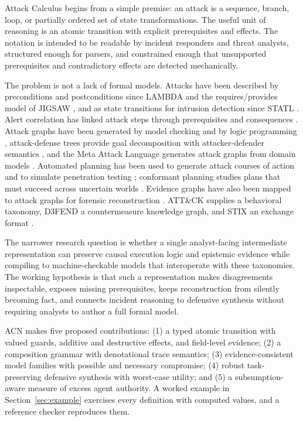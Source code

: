 \documentclass[11pt,letterpaper]{article}
\theoremstyle{definition}
\begin{document}
Attack Calculus begins from a simple premise: an attack is a sequence, branch, loop, or partially ordered set of state transformations. The useful unit of reasoning is an atomic transition with explicit prerequisites and effects. The notation is intended to be readable by incident responders and threat analysts, structured enough for parsers, and constrained enough that unsupported prerequisites and contradictory effects are detected mechanically.

The problem is not a lack of formal models. Attacks have been described by preconditions and postconditions since LAMBDA and the requires/provides model of JIGSAW \cite{cuppens2000,templeton2000}, and as state transitions for intrusion detection since STATL \cite{statl}. Alert correlation has linked attack steps through prerequisites and consequences \cite{ning2002}. Attack graphs have been generated by model checking and by logic programming \cite{sheyner2002,ammann2002,mulval}, attack-defense trees provide goal decomposition with attacker-defender semantics \cite{adtrees}, and the Meta Attack Language generates attack graphs from domain models \cite{mal,konsta2024}. Automated planning has been used to generate attack courses of action and to simulate penetration testing \cite{boddy2005,obes2010,hoffmann2015}; conformant planning studies plans that must succeed across uncertain worlds \cite{cimatti2004}. Evidence graphs have also been mapped to attack graphs for forensic reconstruction \cite{liu2012evidence}. ATT\&CK supplies a behavioral taxonomy, D3FEND a countermeasure knowledge graph, and STIX an exchange format \cite{attack,d3fend,stix}.

The narrower research question is whether a single analyst-facing intermediate representation can preserve causal execution logic and epistemic evidence while compiling to machine-checkable models that interoperate with these taxonomies. The working hypothesis is that such a representation makes disagreements inspectable, exposes missing prerequisites, keeps reconstruction from silently becoming fact, and connects incident reasoning to defensive synthesis without requiring analysts to author a full formal model.

ACN makes five proposed contributions: (1) a typed atomic transition with valued guards, additive and destructive effects, and field-level evidence; (2) a composition grammar with denotational trace semantics; (3) evidence-consistent model families with possible and necessary compromise; (4) robust task-preserving defensive synthesis with worst-case utility; and (5) a subsumption-aware measure of excess agent authority. A worked example in Section~\ref{sec:example} exercises every definition with computed values, and a reference checker reproduces them.
\end{document}
